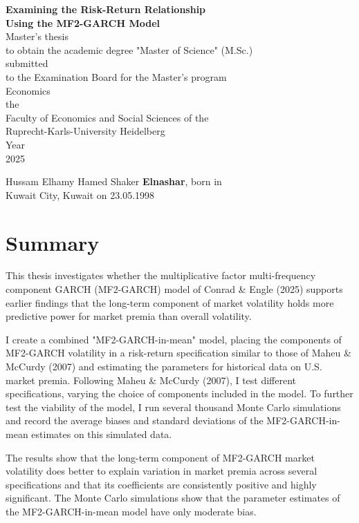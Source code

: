 \documentclass[12pt]{article}
\begin{document}
\thispagestyle{empty}
\hspace{0pt}
\begin{center}
\vfill
\textbf{Examining the Risk-Return Relationship \\Using the MF2-GARCH Model}\\
\vspace{25mm}
Master's thesis\\
to obtain the academic degree "Master of Science" (M.Sc.)\\
\vspace{10mm}
submitted\\
to the Examination Board for the Master's program\\
\vspace{10mm}
Economics\\
\vspace{10mm}
the\\
Faculty of Economics and Social Sciences of the\\
Ruprecht-Karls-University Heidelberg\\
\vspace{10mm}
Year\\
2025
\vspace{10mm}
\end{center}
\vfill
Hussam Elhamy Hamed Shaker \textbf{Elnashar}, born in\\
Kuwait City, Kuwait on 23.05.1998
\hspace{0pt}


\newpage
\thispagestyle{empty}
\section*{Summary}
This thesis investigates whether the multiplicative factor multi-frequency component GARCH (MF2-GARCH) model of Conrad \& Engle (2025) supports earlier findings that the long-term component of market volatility holds more predictive power for market premia than overall volatility.\par
I create a combined "MF2-GARCH-in-mean" model, placing the components of MF2-GARCH volatility in a risk-return specification similar to those of Maheu \& McCurdy (2007) and estimating the parameters for historical data on U.S. market premia. Following Maheu \& McCurdy (2007), I test different specifications, varying the choice of components included in the model. To further test the viability of the model, I run several thousand Monte Carlo simulations and record the average biases and standard deviations of the MF2-GARCH-in-mean estimates on this simulated data.\par
The results show that the long-term component of MF2-GARCH market volatility does better to explain variation in market premia across several specifications and that its coefficients are consistently positive and highly significant. The Monte Carlo simulations show that the parameter estimates of the MF2-GARCH-in-mean model have only moderate bias.\par
\end{document}
